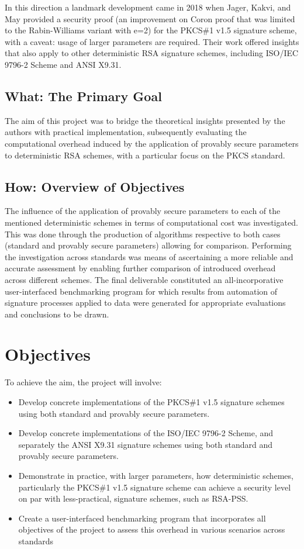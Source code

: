 \documentclass[]{final_report}
\theoremstyle{definition}
\begin{document}
In this direction a landmark development came in 2018 when Jager, Kakvi, and May \cite{jager2018security} provided a security proof (an improvement on Coron \cite{coron2002security} proof that was limited to the Rabin-Williams variant with e=2) for the PKCS\#1 v1.5 signature scheme, with a caveat: usage of larger parameters are required. Their work offered insights that also apply to other deterministic RSA signature schemes, including ISO/IEC 9796-2 Scheme and ANSI X9.31.

\subsection{What: The Primary Goal}
The aim of this project was to bridge the theoretical insights presented by the authors \cite{jager2018security} with practical implementation, subsequently evaluating the computational overhead induced by the application of provably secure parameters to deterministic RSA schemes, with a particular focus on the PKCS standard. 

\subsection{How: Overview of Objectives}
The influence of the application of provably secure parameters to each of the mentioned deterministic schemes in terms of computational cost was investigated. This was done through the production of algorithms respective to both cases (standard and provably secure parameters) allowing for comparison. Performing the investigation across standards was means of ascertaining a more reliable and accurate assessment by enabling further comparison of introduced overhead across different schemes. The final deliverable constituted an all-incorporative user-interfaced benchmarking program for which results from automation of signature processes applied to data were generated for appropriate evaluations and conclusions to be drawn.


\section{Objectives}
To achieve the aim, the project will involve:
\begin{itemize}
    \item Develop concrete implementations of the PKCS\#1 v1.5 signature schemes using both standard and provably secure parameters.
    \item Develop concrete implementations of  the ISO/IEC 9796-2 Scheme, and separately the ANSI X9.31 signature schemes using both standard and provably secure parameters.
    \item Demonstrate in practice, with larger parameters, how deterministic schemes, particularly the PKCS\#1 v1.5 signature scheme  can achieve a security level on par with less-practical, signature schemes, such as RSA-PSS.
    \item Create a user-interfaced benchmarking program that incorporates all objectives of the project to assess this overhead in various scenarios across standards
\end{itemize}
\end{document}
